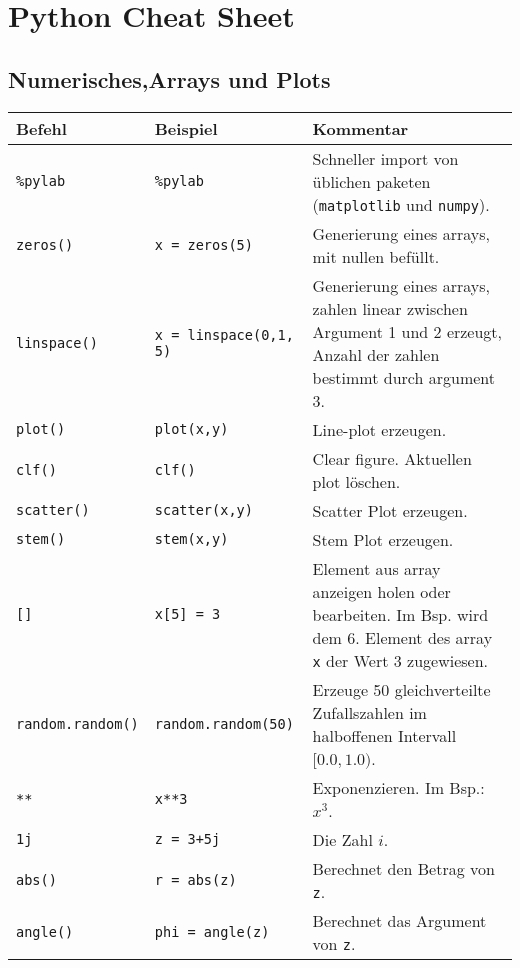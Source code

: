 

\section*{Python Cheat Sheet}
\subsection*{Numerisches,Arrays und Plots}
\begin{table}[H]
    \centering
    \begin{tabular}{|l|l|p{7cm}|}
        \hline
    \textbf{Befehl} & \textbf{Beispiel} & \textbf{Kommentar} \\ \hline
    
    \texttt{\%pylab} & \texttt{\%pylab} & Schneller import von üblichen paketen (\texttt{matplotlib} und \texttt{numpy}). \\ \hline
    \texttt{zeros()} & \texttt{x = zeros(5)} & Generierung eines arrays, mit nullen befüllt. \\ \hline
    \texttt{linspace()} & \texttt{x = linspace(0,1, 5)} & Generierung eines arrays, zahlen linear zwischen Argument 1 und 2 erzeugt, Anzahl der zahlen bestimmt durch argument 3. \\ \hline
    \texttt{plot()} & \texttt{plot(x,y)} & Line-plot erzeugen.  \\ \hline
    \texttt{clf()} & \texttt{clf()} & Clear figure. Aktuellen plot löschen.  \\ \hline
    \texttt{scatter()} & \texttt{scatter(x,y)} & Scatter Plot erzeugen. \\ \hline
    \texttt{stem()} & \texttt{stem(x,y)} & Stem Plot erzeugen. \\ \hline

    \texttt{[]} & \texttt{x[5] = 3} & Element aus array anzeigen holen oder bearbeiten. Im Bsp. wird dem 6. Element des array \texttt{x} der Wert 3 zugewiesen. \\ \hline
    \texttt{random.random()} & \texttt{random.random(50)} & Erzeuge 50 gleichverteilte Zufallszahlen im halboffenen Intervall $[0.0, 1.0)$. \\ \hline
    \texttt{**} & \texttt{x**3} & Exponenzieren. Im Bsp.: $x^3$. \\ \hline
    \texttt{1j} & \texttt{z = 3+5j} & Die Zahl $i$. \\ \hline
    \texttt{abs()} & \texttt{r = abs(z)} & Berechnet den Betrag von \texttt{z}. \\ \hline
    \texttt{angle()} & \texttt{phi = angle(z)} & Berechnet das Argument von \texttt{z}. \\ \hline

    \end{tabular}
\end{table}

